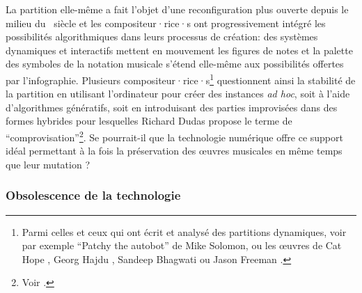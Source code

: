 \noindent La partition elle-même a fait l'objet d'une reconfiguration plus ouverte depuis le milieu du ~siècle et les compositeur·rice·s ont progressivement intégré les possibilités algorithmiques dans leurs processus de création: des systèmes dynamiques et interactifs mettent en mouvement les figures de notes et la palette des symboles de la notation musicale s'étend elle-même aux possibilités offertes par l'infographie. Plusieurs compositeur·rice·s\footnote{Parmi celles et ceux qui ont écrit et analysé des partitions dynamiques, voir par exemple ``Patchy the autobot'' de Mike Solomon, ou les œuvres de Cat Hope \cite{hope_future_2020}, Georg Hajdu \cite{hajdu_disposable_2016}, Sandeep Bhagwati \cite{bhagwati_vexations_2017} ou Jason Freeman \cite{freeman_extreme_2008}.} questionnent ainsi la stabilité de la partition en utilisant l'ordinateur pour créer des instances \textit{ad hoc}, soit à l'aide d'algorithmes génératifs, soit en introduisant des parties improvisées dans des formes hybrides pour lesquelles Richard Dudas propose le terme de ``comprovisation''\footnote{Voir \cite{dudas_comprovisation:_2010}.}. Se pourrait-il que la technologie numérique offre ce support idéal permettant à la fois la préservation des œuvres musicales en même temps que leur mutation ? 

\subsubsection{Obsolescence de la technologie}

